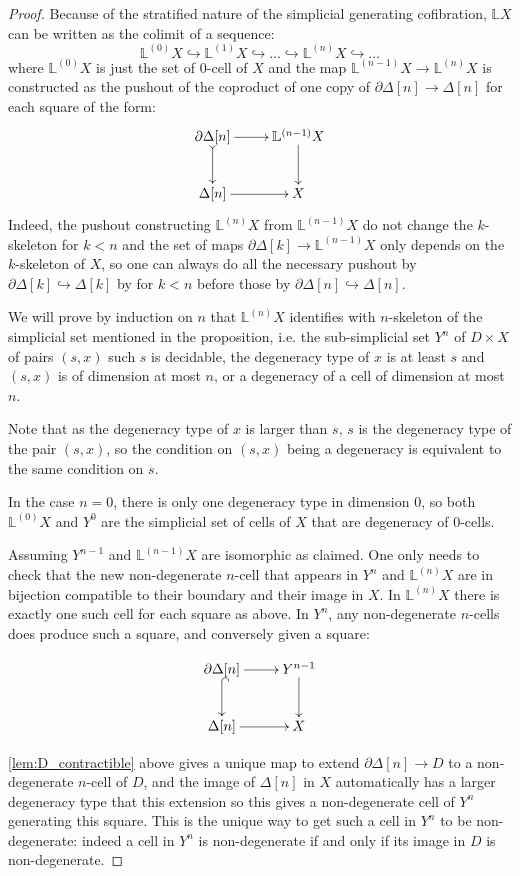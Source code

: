 \documentclass[reqno,10pt,a4paper,oneside,draft]{amsart}
\begin{document}
\begin{proof} Because of the stratified nature of the simplicial generating cofibration, $\mathbb{L} X$ can be written as the colimit of a sequence:
 \[ 
 \mathbb{L}^{(0)} X \hookrightarrow \mathbb{L}^{(1)} X \hookrightarrow \dots \hookrightarrow \mathbb{L}^{(n)} X \hookrightarrow \dots 
 \]
where $\mathbb{L}^{(0)} X$ is just the set of $0$-cell of $X$ and the map $\mathbb{L}^{(n-1)} X \rightarrow \mathbb{L}^{(n)} X$ is constructed as the pushout of the coproduct of one copy of $\partial \Delta[n] \rightarrow \Delta[n]$ for each square of the form:
\[ 
\xymatrix{\partial \Delta[n]  \ar[r] \ar@{>->}[d] & \mathbb{L}^{(n-1)} X \ar[d] \\ \Delta[n]  \ar[r] & X} 
\]
Indeed, the pushout constructing $\mathbb{L}^{(n)} X$ from $\mathbb{L}^{(n-1)} X$ do not change the $k$-skeleton for $k <n$ and the set of maps $\partial \Delta[k] \rightarrow \mathbb{L}^{(n-1)} X$ only depends on the $k$-skeleton of $X$, so one can always do all the necessary pushout by $\partial \Delta[k] \hookrightarrow \Delta[k]$ by for $k<n$ before those by $\partial \Delta[n] \hookrightarrow \Delta[n]$.


We will prove by induction on $n$ that $\mathbb{L}^{(n)} X$ identifies with $n$-skeleton of the simplicial set mentioned in the proposition, i.e. the sub-simplicial set $Y^n$ of $D \times X$ of pairs $(s,x)$ such $s$ is decidable,  the degeneracy type of $x$ is at least $s$ and $(s,x)$ is of dimension at most $n$, or a degeneracy of a cell of dimension at most $n$.

Note that as the degeneracy type of $x$ is larger than $s$, $s$ is the degeneracy type of the pair $(s,x)$, so the condition on $(s,x)$ being a degeneracy is equivalent to the same condition on $s$.

In the case $n=0$, there is only one degeneracy type in dimension $0$, so both $\mathbb{L}^{(0)} X $ and $Y^0$ are the simplicial set of cells of $X$ that are degeneracy of $0$-cells.

Assuming $Y^{n-1}$ and $\mathbb{L}^{(n-1)} X$ are isomorphic as claimed. One only needs to check that the new non-degenerate $n$-cell that appears in $Y^{n}$ and $\mathbb{L}^{(n)} X $ are in bijection compatible to their boundary and their image in $X$.
In $\mathbb{L}^{(n)} X $ there is exactly one such cell for each square as above. In $Y^{n}$, any non-degenerate $n$-cells does produce such a square, and conversely given a square:

\[ \xymatrix{\partial \Delta[n]  \ar[r] \ar@{^{(}->}[d] & Y^{n-1} \ar[d] \\ \Delta[n]  \ar[r] & X} \]

\cref{lem:D_contractible} above gives a unique map to extend $\partial \Delta[n] \rightarrow D$ to a non-degenerate $n$-cell of $D$, and the image of $\Delta[n]$ in $X$ automatically has a larger degeneracy type that this extension so this gives a non-degenerate cell of $Y^{n}$ generating this square. This is the unique way to get such a cell in $Y^n$ to be non-degenerate: indeed a cell in $Y^n$ is non-degenerate if and only if its image in $D$ is non-degenerate.
\end{proof}
\end{document}
